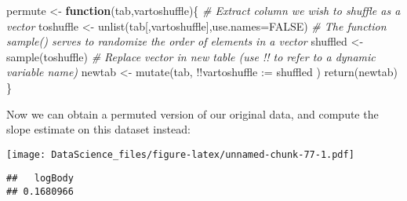 \documentclass[
]{book}
\newenvironment{Shaded}{\begin{snugshade}}{\end{snugshade}}
\newcommand{\AttributeTok}[1]{\textcolor[rgb]{0.77,0.63,0.00}{#1}}
\newcommand{\CommentTok}[1]{\textcolor[rgb]{0.56,0.35,0.01}{\textit{#1}}}
\newcommand{\ConstantTok}[1]{\textcolor[rgb]{0.00,0.00,0.00}{#1}}
\newcommand{\ControlFlowTok}[1]{\textcolor[rgb]{0.13,0.29,0.53}{\textbf{#1}}}
\newcommand{\DecValTok}[1]{\textcolor[rgb]{0.00,0.00,0.81}{#1}}
\newcommand{\FunctionTok}[1]{\textcolor[rgb]{0.00,0.00,0.00}{#1}}
\newcommand{\NormalTok}[1]{#1}
\newcommand{\OtherTok}[1]{\textcolor[rgb]{0.56,0.35,0.01}{#1}}
\newcommand{\SpecialCharTok}[1]{\textcolor[rgb]{0.00,0.00,0.00}{#1}}
\newcommand{\StringTok}[1]{\textcolor[rgb]{0.31,0.60,0.02}{#1}}
\begin{document}
\begin{Shaded}
\begin{Highlighting}[]
\NormalTok{permute }\OtherTok{\textless{}{-}} \ControlFlowTok{function}\NormalTok{(tab,vartoshuffle)\{}
  \CommentTok{\# Extract column we wish to shuffle as a vector}
\NormalTok{  toshuffle }\OtherTok{\textless{}{-}} \FunctionTok{unlist}\NormalTok{(tab[,vartoshuffle],}\AttributeTok{use.names=}\ConstantTok{FALSE}\NormalTok{)}
  \CommentTok{\# The function sample() serves to randomize the order of elements in a vector}
\NormalTok{  shuffled }\OtherTok{\textless{}{-}} \FunctionTok{sample}\NormalTok{(toshuffle)}
  \CommentTok{\# Replace vector in new table (use !! to refer to a dynamic variable name)}
\NormalTok{  newtab }\OtherTok{\textless{}{-}} \FunctionTok{mutate}\NormalTok{(tab, }\SpecialCharTok{!!}\AttributeTok{vartoshuffle :=}\NormalTok{ shuffled )}
  \FunctionTok{return}\NormalTok{(newtab)}
\NormalTok{\}}
\end{Highlighting}
\end{Shaded}

Now we can obtain a permuted version of our original data, and compute the slope estimate on this dataset instead:

\begin{Shaded}
\end{Shaded}

\texttt{[image: DataScience\_files/figure-latex/unnamed-chunk-77-1.pdf]}

\begin{Shaded}
\end{Shaded}

\begin{verbatim}
##   logBody 
## 0.1680966
\end{verbatim}
\end{document}
